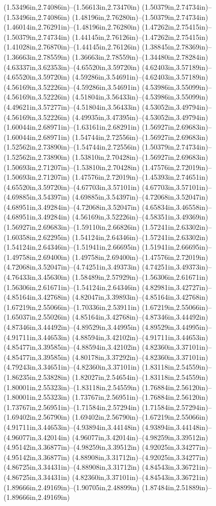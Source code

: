 (1.53496in,2.74086in)--(1.56613in,2.73470in) (1.50379in,2.74734in)--(1.53496in,2.74086in) (1.48196in,2.76280in)--(1.50379in,2.74734in) (1.46014in,2.76291in)--(1.48196in,2.76280in) (1.47262in,2.75415in)--(1.50379in,2.74734in) (1.44145in,2.76126in)--(1.47262in,2.75415in) (1.41028in,2.76870in)--(1.44145in,2.76126in) (1.38845in,2.78369in)--(1.36663in,2.78559in) (1.36663in,2.78559in)--(1.34480in,2.78284in) (4.63337in,3.62353in)--(4.65520in,3.59720in) (4.62403in,3.57189in)--(4.65520in,3.59720in) (4.59286in,3.54691in)--(4.62403in,3.57189in) (4.56169in,3.52226in)--(4.59286in,3.54691in) (4.53986in,3.55099in)--(4.56169in,3.52226in) (4.51804in,3.56433in)--(4.53986in,3.55099in) (4.49621in,3.57277in)--(4.51804in,3.56433in) (4.53052in,3.49794in)--(4.56169in,3.52226in) (4.49935in,3.47395in)--(4.53052in,3.49794in) (1.60044in,2.68971in)--(1.63161in,2.68291in) (1.56927in,2.69683in)--(1.60044in,2.68971in) (1.54744in,2.72556in)--(1.56927in,2.69683in) (1.52562in,2.73890in)--(1.54744in,2.72556in) (1.50379in,2.74734in)--(1.52562in,2.73890in) (1.53810in,2.70428in)--(1.56927in,2.69683in) (1.50693in,2.71207in)--(1.53810in,2.70428in) (1.47576in,2.72019in)--(1.50693in,2.71207in) (1.47576in,2.72019in)--(1.45393in,2.74651in) (4.65520in,3.59720in)--(4.67703in,3.57101in) (4.67703in,3.57101in)--(4.69885in,3.54397in) (4.69885in,3.54397in)--(4.72068in,3.52047in) (4.68951in,3.49284in)--(4.72068in,3.52047in) (4.65834in,3.46558in)--(4.68951in,3.49284in) (4.56169in,3.52226in)--(4.58351in,3.49369in) (1.56927in,2.69683in)--(1.59110in,2.66826in) (1.57241in,2.63302in)--(1.60358in,2.62295in) (1.54124in,2.64346in)--(1.57241in,2.63302in) (1.54124in,2.64346in)--(1.51941in,2.66695in) (1.51941in,2.66695in)--(1.49758in,2.69400in) (1.49758in,2.69400in)--(1.47576in,2.72019in) (4.72068in,3.52047in)--(4.74251in,3.49373in) (4.74251in,3.49373in)--(4.76433in,3.45630in) (1.58489in,2.57929in)--(1.56306in,2.61671in) (1.56306in,2.61671in)--(1.54124in,2.64346in) (4.82981in,3.42727in)--(4.85164in,3.42768in) (4.82047in,3.39893in)--(4.85164in,3.42768in) (1.67219in,2.55066in)--(1.70336in,2.53911in) (1.67219in,2.55066in)--(1.65037in,2.55026in) (4.85164in,3.42768in)--(4.87346in,3.44492in) (4.87346in,3.44492in)--(4.89529in,3.44995in) (4.89529in,3.44995in)--(4.91711in,3.44653in) (4.88594in,3.42102in)--(4.91711in,3.44653in) (4.85477in,3.39585in)--(4.88594in,3.42102in) (4.82360in,3.37101in)--(4.85477in,3.39585in) (4.80178in,3.37292in)--(4.82360in,3.37101in) (4.79243in,3.34651in)--(4.82360in,3.37101in) (1.83118in,2.54559in)--(1.86235in,2.53828in) (1.82027in,2.54654in)--(1.83118in,2.54559in) (1.80001in,2.55323in)--(1.83118in,2.54559in) (1.76884in,2.56120in)--(1.80001in,2.55323in) (1.73767in,2.56951in)--(1.76884in,2.56120in) (1.73767in,2.56951in)--(1.71584in,2.57294in) (1.71584in,2.57294in)--(1.69402in,2.56790in) (1.69402in,2.56790in)--(1.67219in,2.55066in) (4.91711in,3.44653in)--(4.93894in,3.44148in) (4.93894in,3.44148in)--(4.96077in,3.42014in) (4.96077in,3.42014in)--(4.98259in,3.39512in) (4.95142in,3.36877in)--(4.98259in,3.39512in) (4.92025in,3.34277in)--(4.95142in,3.36877in) (4.88908in,3.31712in)--(4.92025in,3.34277in) (4.86725in,3.34431in)--(4.88908in,3.31712in) (4.84543in,3.36721in)--(4.86725in,3.34431in) (4.82360in,3.37101in)--(4.84543in,3.36721in) (1.89666in,2.49169in)--(1.90705in,2.48899in) (1.87484in,2.51889in)--(1.89666in,2.49169in) 